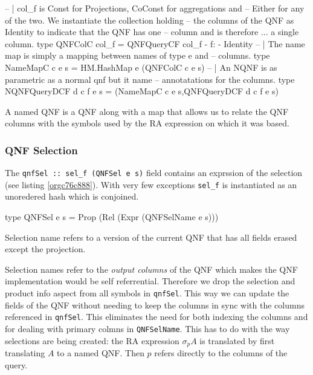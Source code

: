 \begin{listing}[p]
  \begin{haskell}
    -- | col_f is Const for Projections, CoConst for aggregations and
    -- Either for any of the two. We instantiate the collection holding
    -- the columns of the QNF as Identity to indicate that the QNF has one
    -- column and is therefore ... a single column.
    type QNFColC col_f = QNFQueryCF col_f {- f: -} Identity
    -- | The name map is simply a mapping between names of type e and
    -- columns.
    type NameMapC c e s = HM.HashMap e (QNFColC c e s)
    -- | An NQNF is as parametric as a normal qnf but it name
    -- annotatations for the columns.
    type NQNFQueryDCF d c f e s = (NameMapC c e s,QNFQueryDCF d c f e s)
  \end{haskell}
  \caption{\label{org68b5d7d}A named QNF is a QNF along with a map that allows us to relate the QNF columns with the symbols used by the RA expression on which it was based.}
\end{listing}


\subsubsection{QNF Selection}
\label{sec:org4074deb}
The \texttt{qnfSel :: sel\_f (QNFSel e s)} field contains an exprssion of the
selection (see listing \ref{orgc76c888}). With very few exceptions \texttt{sel\_f}
is instantiated as an unoredered hash which is conjoined.

\begin{listing}[p]
  \begin{haskell}
    type QNFSel e s = Prop (Rel (Expr (QNFSelName e s)))
  \end{haskell}
  \caption{\label{orgc76c888}Selection name refers to a version of the current QNF that has all fields erased except the projection.}
\end{listing}

Selection names refer to the \emph{output columns} of the QNF which makes
the QNF implementation would be self referrential. Therefore we drop
the selection and product info aspect from all symbols in
\texttt{qnfSel}. This way we can update the fields of the QNF without needing
to keep the columns in sync with the columns referenced in
\texttt{qnfSel}. This eliminates the need for both indexing the columns and
for dealing with primary colmns in \texttt{QNFSelName}. This has to do with
the way selections are being created: the RA expression \(\sigma_p A\)
is translated by first translating \(A\) to a named QNF. Then \(p\)
refers directly to the columns of the query.

